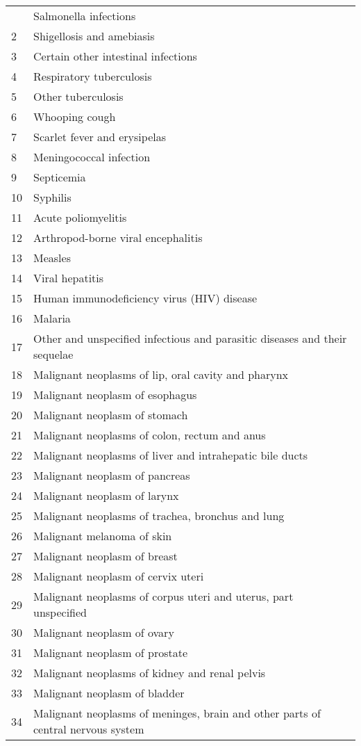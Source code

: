 \documentclass{article}
\begin{document}
\begin{center}
\begin{longtable}{|l|l|}
\hline \hline
\endlastfoot
1&	Salmonella infections\\
2&	Shigellosis and amebiasis\\
3&	Certain other intestinal infections\\
4&	Respiratory tuberculosis\\
5&	Other tuberculosis\\
6&	Whooping cough\\
7&	Scarlet fever and erysipelas\\
8&	Meningococcal infection\\
9&	Septicemia\\
10&	Syphilis\\
11&	Acute poliomyelitis\\
12&	Arthropod-borne viral encephalitis\\
13&	Measles\\
14&	Viral hepatitis\\
15&	Human immunodeficiency virus (HIV) disease\\
16&	Malaria\\
17&	Other and unspecified infectious and parasitic diseases and their sequelae\\
18&	Malignant neoplasms of lip, oral cavity and pharynx\\
19&	Malignant neoplasm of esophagus\\
20&	Malignant neoplasm of stomach\\
21&	Malignant neoplasms of colon, rectum and anus\\
22&	Malignant neoplasms of liver and intrahepatic bile ducts\\
23&	Malignant neoplasm of pancreas\\
24&	Malignant neoplasm of larynx\\
25&	Malignant neoplasms of trachea, bronchus and lung\\
26&	Malignant melanoma of skin\\
27&	Malignant neoplasm of breast\\
28&	Malignant neoplasm of cervix uteri\\
29&	Malignant neoplasms of corpus uteri and uterus, part unspecified\\
30&	Malignant neoplasm of ovary\\
31&	Malignant neoplasm of prostate\\
32&	Malignant neoplasms of kidney and renal pelvis\\
33&	Malignant neoplasm of bladder\\
34&	Malignant neoplasms of meninges, brain and other parts of central nervous system\\

\end{longtable}
\end{center}
\end{document}
